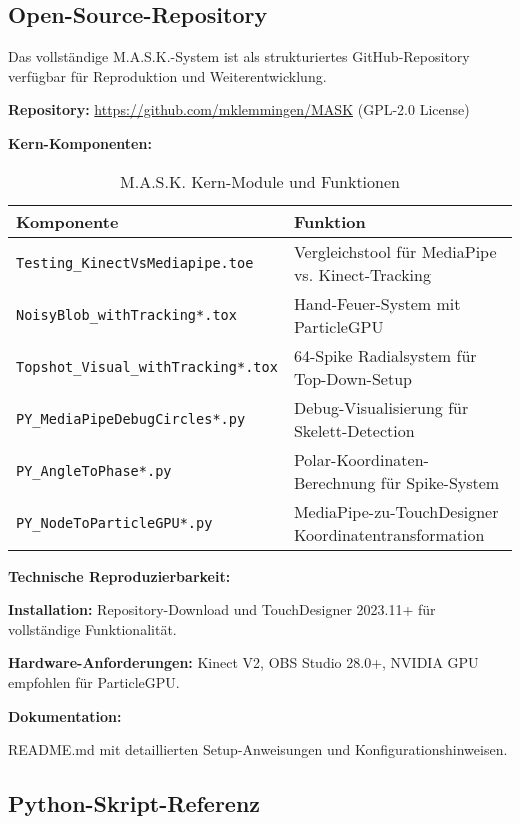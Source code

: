 \subsection{Open-Source-Repository}

Das vollständige M.A.S.K.-System ist als strukturiertes GitHub-Repository verfügbar für Reproduktion und Weiterentwicklung.

\textbf{Repository:} \url{https://github.com/mklemmingen/MASK} (GPL-2.0 License)

\textbf{Kern-Komponenten:}

\begin{table}[H]
    \centering
    \begin{tabular}{|l|p{8cm}|}
        \hline
        \textbf{Komponente} & \textbf{Funktion} \\ \hline
        \texttt{Testing\_KinectVsMediapipe.toe} & Vergleichstool für MediaPipe vs. Kinect-Tracking \\ \hline
        \texttt{NoisyBlob\_withTracking*.tox} & Hand-Feuer-System mit ParticleGPU \\ \hline
        \texttt{Topshot\_Visual\_withTracking*.tox} & 64-Spike Radialsystem für Top-Down-Setup \\ \hline
        \texttt{PY\_MediaPipeDebugCircles*.py} & Debug-Visualisierung für Skelett-Detection \\ \hline
        \texttt{PY\_AngleToPhase*.py} & Polar-Koordinaten-Berechnung für Spike-System \\ \hline
        \texttt{PY\_NodeToParticleGPU*.py} & MediaPipe-zu-TouchDesigner Koordinatentransformation \\ \hline
    \end{tabular}
    \caption{M.A.S.K. Kern-Module und Funktionen}
    \label{tab:core_modules}
\end{table}

\textbf{Technische Reproduzierbarkeit:}

\textbf{Installation:} Repository-Download und TouchDesigner 2023.11+ für vollständige Funktionalität.

\textbf{Hardware-Anforderungen:} Kinect V2, OBS Studio 28.0+, NVIDIA GPU empfohlen für ParticleGPU.

\textbf{Dokumentation:} \raggedright README.md mit detaillierten Setup-Anweisungen und Konfigurationshinweisen.

\subsection{Python-Skript-Referenz}

